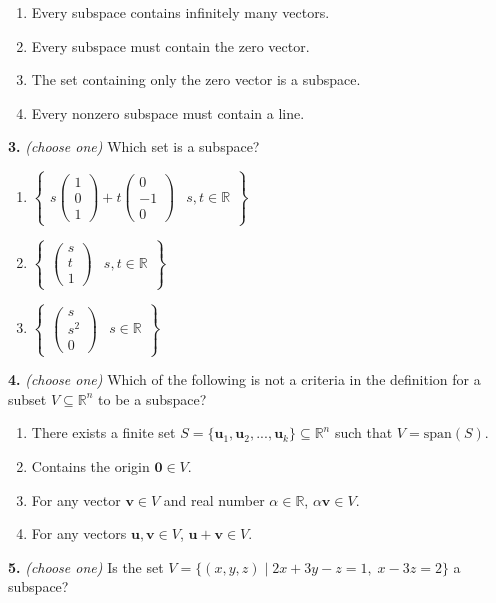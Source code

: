 \documentclass[10pt,a4paper]{article}
\begin{document}
\begin{enumerate}[label=(\Alph*)]
\item Every subspace contains infinitely many vectors.
\item Every subspace must contain the zero vector.
\item The set containing only the zero vector is a subspace.
\item Every nonzero subspace must contain a line.
\end{enumerate}
\smallskip
\textbf{3.} \textit{(choose one)} Which set is a subspace?

\begin{enumerate}[label=(\Alph*)]
\item \(\left\{\begin{array}{c|c}s\begin{pmatrix}1\\0\\1\end{pmatrix}+t\begin{pmatrix}0\\-1\\0\end{pmatrix}&s,t\in\mathbb{R}\end{array}\right\}\)
\item \(\left\{\begin{array}{c|c}\begin{pmatrix}s\\t\\1\end{pmatrix}&s,t\in\mathbb{R}\end{array}\right\}\)
\item \(\left\{\begin{array}{c|c}\begin{pmatrix}s\\s^2\\0\end{pmatrix}&s\in\mathbb{R}\end{array}\right\}\)
\end{enumerate}
\smallskip
\textbf{4.} \textit{(choose one)} Which of the following is not a criteria in the definition for a subset \(V\subseteq\mathbb R^n\) to be a subspace?

\begin{enumerate}[label=(\Alph*)]
\item There exists a finite set \(S=\{\mathbf{u}_1,\mathbf{u}_2,...,\mathbf{u}_k\}\subseteq\mathbb{R}^n\) such that \(V=\text{span}(S)\).
\item Contains the origin \(\mathbf{0}\in V\).
\item For any vector \(\mathbf{v}\in V\) and real number \(\alpha\in\mathbb{R}\), \(\alpha\mathbf{v}\in V\).
\item For any vectors \(\mathbf{u},\mathbf{v}\in V\), \(\mathbf{u}+\mathbf{v}\in V\).
\end{enumerate}
\smallskip
\textbf{5.} \textit{(choose one)} Is the set \(V=\{(x,y,z)\mid 2x+3y-z=1,\;x-3z=2\}\) a subspace?
\end{document}
